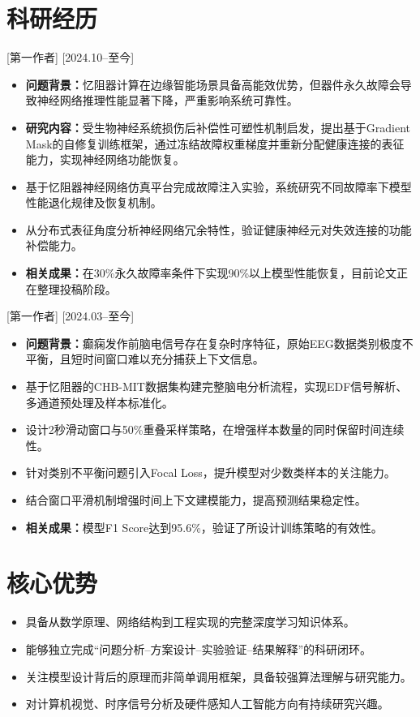\documentclass{resume-photo}
\begin{document}
\section{科研经历}

[\textnormal{第一作者}]
[2024.10--至今]

\begin{itemize}
  \item \textbf{问题背景：}忆阻器计算在边缘智能场景具备高能效优势，但器件永久故障会导致神经网络推理性能显著下降，严重影响系统可靠性。
  \item \textbf{研究内容：}受生物神经系统损伤后补偿性可塑性机制启发，提出基于Gradient Mask的自修复训练框架，通过冻结故障权重梯度并重新分配健康连接的表征能力，实现神经网络功能恢复。
  \item 基于忆阻器神经网络仿真平台完成故障注入实验，系统研究不同故障率下模型性能退化规律及恢复机制。
  \item 从分布式表征角度分析神经网络冗余特性，验证健康神经元对失效连接的功能补偿能力。
  \item \textbf{相关成果：}在30\%永久故障率条件下实现90\%以上模型性能恢复，目前论文正在整理投稿阶段。
\end{itemize}

[\textnormal{第一作者}]
[2024.03--至今]

\begin{itemize}
  \item \textbf{问题背景：}癫痫发作前脑电信号存在复杂时序特征，原始EEG数据类别极度不平衡，且短时间窗口难以充分捕获上下文信息。
  \item 基于忆阻器的CHB-MIT数据集构建完整脑电分析流程，实现EDF信号解析、多通道预处理及样本标准化。
  \item 设计2秒滑动窗口与50\%重叠采样策略，在增强样本数量的同时保留时间连续性。
  \item 针对类别不平衡问题引入Focal Loss，提升模型对少数类样本的关注能力。
  \item 结合窗口平滑机制增强时间上下文建模能力，提高预测结果稳定性。
  \item \textbf{相关成果：}模型F1 Score达到95.6\%，验证了所设计训练策略的有效性。
\end{itemize}


\section{核心优势}
\begin{itemize}
  \item 具备从数学原理、网络结构到工程实现的完整深度学习知识体系。
  \item 能够独立完成“问题分析--方案设计--实验验证--结果解释”的科研闭环。
  \item 关注模型设计背后的原理而非简单调用框架，具备较强算法理解与研究能力。
  \item 对计算机视觉、时序信号分析及硬件感知人工智能方向有持续研究兴趣。
\end{itemize}
\end{document}
